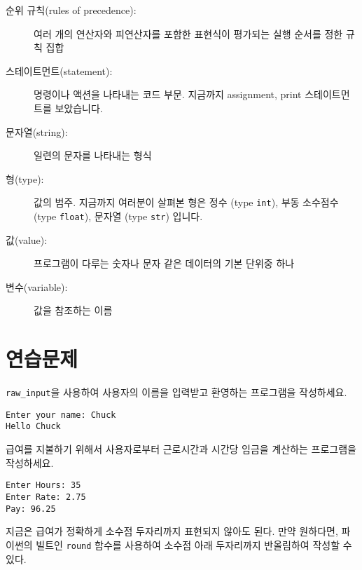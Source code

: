 \begin{description}
\item[순위 규칙(rules of precedence):] 여러 개의 연산자와 피연산자를 포함한 표현식이 평가되는 실행 순서를 정한 규칙 집합

\item[스테이트먼트(statement):]  명령이나 액션을 나타내는 코드 부문. 지금까지 assignment, print 스테이트먼트를 보았습니다.

\item[문자열(string):] 일련의 문자를 나타내는 형식

\item[형(type):] 값의 범주. 지금까지 여러분이 살펴본 형은 정수 (type {\tt int}), 부동 소수점수 (type {\tt float}), 문자열 (type {\tt str}) 입니다.

\item[값(value):]  프로그램이 다루는 숫자나 문자 같은 데이터의 기본 단위중 하나

\item[변수(variable):] 값을 참조하는 이름

\end{description}

\section{연습문제}

\begin{ex}
\verb"raw_input"을 사용하여 사용자의 이름을 입력받고 환영하는 프로그램을 작성하세요.

\begin{verbatim}
Enter your name: Chuck
Hello Chuck
\end{verbatim}

\end{ex}

\begin{ex}
급여를 지불하기 위해서 사용자로부터 근로시간과 시간당 임금을 계산하는 프로그램을 작성하세요.
\begin{verbatim}
Enter Hours: 35
Enter Rate: 2.75
Pay: 96.25
\end{verbatim}
\end{ex}
%
지금은 급여가 정확하게 소수점 두자리까지 표현되지 않아도 된다. 만약 원하다면, 파이썬의 빌트인 {\tt round} 함수를 사용하여 소수점 아래 두자리까지 반올림하여 작성할 수 있다.

